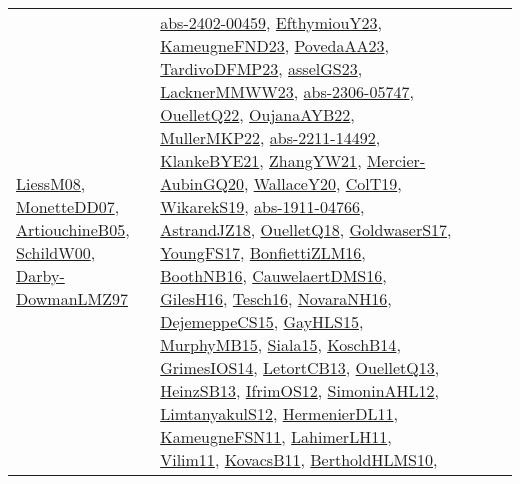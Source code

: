 {\begin{longtable}{llp{6cm}p{6cm}p{6cm}}
\href{articles/LiessM08.pdf}{LiessM08}\cite{LiessM08}, \href{papers/MonetteDD07.pdf}{MonetteDD07}\cite{MonetteDD07}, \href{papers/ArtiouchineB05.pdf}{ArtiouchineB05}\cite{ArtiouchineB05}, \href{articles/SchildW00.pdf}{SchildW00}\cite{SchildW00}, \href{articles/Darby-DowmanLMZ97.pdf}{Darby-DowmanLMZ97}\cite{Darby-DowmanLMZ97} & \href{articles/abs-2402-00459.pdf}{abs-2402-00459}\cite{abs-2402-00459}, \href{papers/EfthymiouY23.pdf}{EfthymiouY23}\cite{EfthymiouY23}, \href{papers/KameugneFND23.pdf}{KameugneFND23}\cite{KameugneFND23}, \href{papers/PovedaAA23.pdf}{PovedaAA23}\cite{PovedaAA23}, \href{papers/TardivoDFMP23.pdf}{TardivoDFMP23}\cite{TardivoDFMP23}, \href{papers/asselGS23.pdf}{asselGS23}\cite{asselGS23}, \href{articles/LacknerMMWW23.pdf}{LacknerMMWW23}\cite{LacknerMMWW23}, \href{articles/abs-2306-05747.pdf}{abs-2306-05747}\cite{abs-2306-05747}, \href{papers/OuelletQ22.pdf}{OuelletQ22}\cite{OuelletQ22}, \href{papers/OujanaAYB22.pdf}{OujanaAYB22}\cite{OujanaAYB22}, \href{articles/MullerMKP22.pdf}{MullerMKP22}\cite{MullerMKP22}, \href{articles/abs-2211-14492.pdf}{abs-2211-14492}\cite{abs-2211-14492}, \href{papers/KlankeBYE21.pdf}{KlankeBYE21}\cite{KlankeBYE21}, \href{articles/ZhangYW21.pdf}{ZhangYW21}\cite{ZhangYW21}, \href{papers/Mercier-AubinGQ20.pdf}{Mercier-AubinGQ20}\cite{Mercier-AubinGQ20}, \href{articles/WallaceY20.pdf}{WallaceY20}\cite{WallaceY20}, \href{papers/ColT19.pdf}{ColT19}\cite{ColT19}, \href{articles/WikarekS19.pdf}{WikarekS19}\cite{WikarekS19}, \href{articles/abs-1911-04766.pdf}{abs-1911-04766}\cite{abs-1911-04766}, \href{papers/AstrandJZ18.pdf}{AstrandJZ18}\cite{AstrandJZ18}, \href{papers/OuelletQ18.pdf}{OuelletQ18}\cite{OuelletQ18}, \href{papers/GoldwaserS17.pdf}{GoldwaserS17}\cite{GoldwaserS17}, \href{papers/YoungFS17.pdf}{YoungFS17}\cite{YoungFS17}, \href{papers/BonfiettiZLM16.pdf}{BonfiettiZLM16}\cite{BonfiettiZLM16}, \href{papers/BoothNB16.pdf}{BoothNB16}\cite{BoothNB16}, \href{papers/CauwelaertDMS16.pdf}{CauwelaertDMS16}\cite{CauwelaertDMS16}, \href{papers/GilesH16.pdf}{GilesH16}\cite{GilesH16}, \href{papers/Tesch16.pdf}{Tesch16}\cite{Tesch16}, \href{articles/NovaraNH16.pdf}{NovaraNH16}\cite{NovaraNH16}, \href{papers/DejemeppeCS15.pdf}{DejemeppeCS15}\cite{DejemeppeCS15}, \href{papers/GayHLS15.pdf}{GayHLS15}\cite{GayHLS15}, \href{papers/MurphyMB15.pdf}{MurphyMB15}\cite{MurphyMB15}, \href{articles/Siala15.pdf}{Siala15}\cite{Siala15}, \href{papers/KoschB14.pdf}{KoschB14}\cite{KoschB14}, \href{articles/GrimesIOS14.pdf}{GrimesIOS14}\cite{GrimesIOS14}, \href{papers/LetortCB13.pdf}{LetortCB13}\cite{LetortCB13}, \href{papers/OuelletQ13.pdf}{OuelletQ13}\cite{OuelletQ13}, \href{articles/HeinzSB13.pdf}{HeinzSB13}\cite{HeinzSB13}, \href{papers/IfrimOS12.pdf}{IfrimOS12}\cite{IfrimOS12}, \href{papers/SimoninAHL12.pdf}{SimoninAHL12}\cite{SimoninAHL12}, \href{articles/LimtanyakulS12.pdf}{LimtanyakulS12}\cite{LimtanyakulS12}, \href{papers/HermenierDL11.pdf}{HermenierDL11}\cite{HermenierDL11}, \href{papers/KameugneFSN11.pdf}{KameugneFSN11}\cite{KameugneFSN11}, \href{papers/LahimerLH11.pdf}{LahimerLH11}\cite{LahimerLH11}, \href{papers/Vilim11.pdf}{Vilim11}\cite{Vilim11}, \href{articles/KovacsB11.pdf}{KovacsB11}\cite{KovacsB11}, \href{papers/BertholdHLMS10.pdf}{BertholdHLMS10}\cite{BertholdHLMS10}, 
\end{longtable}}
